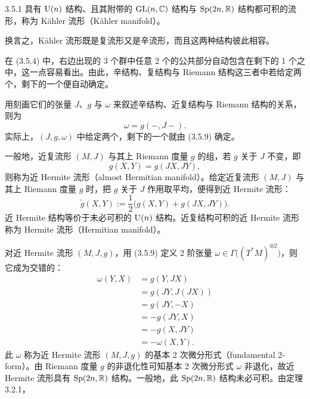 \begin{definition}{3.5.1}
  具有 $\operatorname{U}(n)$ 结构、且其附带的 $\operatorname{GL}(n,\mathbb{C})$ 结构与 $\operatorname{Sp}(2n,\mathbb{R})$ 结构都可积的流形，称为 Kähler 流形（Kähler manifold）。
\end{definition}

换言之，Kähler 流形既是复流形又是辛流形，而且这两种结构彼此相容。

在 (3.5.4) 中，右边出现的 3 个群中任意 2 个的公共部分自动包含在剩下的 1 个之中，这一点容易看出。由此，辛结构、复结构与 Riemann 结构这三者中若给定两个，剩下的一个便自动确定。

用刻画它们的张量 $J$、$g$ 与 $\omega$ 来叙述辛结构、近复结构与 Riemann 结构的关系，则为
\begin{equation}
  \omega=g(-,J-).
  \tag{3.5.9}
\end{equation}
实际上，$(J,g,\omega)$ 中给定两个，剩下的一个就由 (3.5.9) 确定。

一般地，近复流形 $(M,J)$ 与其上 Riemann 度量 $g$ 的组，若 $g$ 关于 $J$ 不变，即
\begin{equation}
  g(X,Y)=g(JX,JY),
  \tag{3.5.10}
\end{equation}
则称为近 Hermite 流形（almost Hermitian manifold）。给定近复流形 $(M,J)$ 与其上 Riemann 度量 $g$ 时，把 $g$ 关于 $J$ 作用取平均，便得到近 Hermite 流形：
\begin{equation}
  \tilde g(X,Y):=\frac{1}{2}\bigl(g(X,Y)+g(JX,JY)\bigr).
  \tag{3.5.11}
\end{equation}
近 Hermite 结构等价于未必可积的 $\operatorname{U}(n)$ 结构。近复结构可积的近 Hermite 流形称为 Hermite 流形（Hermitian manifold）。

对近 Hermite 流形 $(M,J,g)$，用 (3.5.9) 定义 2 阶张量 $\omega\in\Gamma\bigl((T^*M)^{\otimes2}\bigr)$，则它成为交错的：
\begin{align}
  \omega(Y,X)&=g(Y,JX) \tag{3.5.12}\\
  &=g(JY,J(JX)) \tag{3.5.13}\\
  &=g(JY,-X) \tag{3.5.14}\\
  &=-g(JY,X) \tag{3.5.15}\\
  &=-g(X,JY) \tag{3.5.16}\\
  &=-\omega(X,Y). \tag{3.5.17}
\end{align}
此 $\omega$ 称为近 Hermite 流形 $(M,J,g)$ 的基本 2 次微分形式（fundamental 2-form）。由 Riemann 度量 $g$ 的非退化性可知基本 2 次微分形式 $\omega$ 非退化，故近 Hermite 流形具有 $\operatorname{Sp}(2n,\mathbb{R})$ 结构。一般地，此 $\operatorname{Sp}(2n,\mathbb{R})$ 结构未必可积。由定理 3.2.1，

